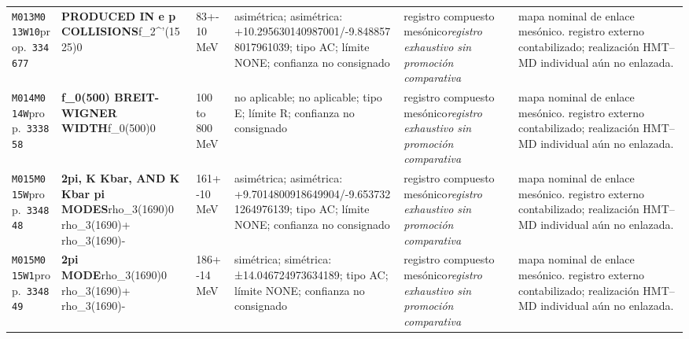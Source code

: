 \begin{landscape}
\begin{longtable}{L{1.85cm}L{4.45cm}L{2.35cm}L{4.05cm}L{3.35cm}L{7.15cm}}
\texttt{M013}\newline \texttt{M013W10}\newline prop.\ \texttt{334677} & \textbf{PRODUCED IN e p COLLISIONS}\newline f\_\allowbreak{}2\textasciicircum{}'(1525)0 & 83+-10\,MeV & asimétrica; asimétrica: +10.295630140987001/-9.8488578017961039; tipo AC; límite NONE; confianza no consignado & registro compuesto mesónico\newline \emph{registro exhaustivo sin promoción comparativa} & mapa nominal de enlace mesónico. registro externo contabilizado; realización HMT--MD individual aún no enlazada. \\
\texttt{M014}\newline \texttt{M014W}\newline prop.\ \texttt{333858} & \textbf{f\_\allowbreak{}0(500) BREIT-WIGNER WIDTH}\newline f\_\allowbreak{}0(500)0 & 100 to 800\,MeV & no aplicable; no aplicable; tipo E; límite R; confianza no consignado & registro compuesto mesónico\newline \emph{registro exhaustivo sin promoción comparativa} & mapa nominal de enlace mesónico. registro externo contabilizado; realización HMT--MD individual aún no enlazada. \\
\texttt{M015}\newline \texttt{M015W}\newline prop.\ \texttt{334848} & \textbf{2pi, K Kbar, AND K Kbar pi MODES}\newline rho\_\allowbreak{}3(1690)0 \textbar{}\allowbreak{} rho\_\allowbreak{}3(1690)+ \textbar{}\allowbreak{} rho\_\allowbreak{}3(1690)- & 161+-10\,MeV & asimétrica; asimétrica: +9.7014800918649904/-9.6537321264976139; tipo AC; límite NONE; confianza no consignado & registro compuesto mesónico\newline \emph{registro exhaustivo sin promoción comparativa} & mapa nominal de enlace mesónico. registro externo contabilizado; realización HMT--MD individual aún no enlazada. \\
\texttt{M015}\newline \texttt{M015W1}\newline prop.\ \texttt{334849} & \textbf{2pi MODE}\newline rho\_\allowbreak{}3(1690)0 \textbar{}\allowbreak{} rho\_\allowbreak{}3(1690)+ \textbar{}\allowbreak{} rho\_\allowbreak{}3(1690)- & 186+-14\,MeV & simétrica; simétrica: ±14.046724973634189; tipo AC; límite NONE; confianza no consignado & registro compuesto mesónico\newline \emph{registro exhaustivo sin promoción comparativa} & mapa nominal de enlace mesónico. registro externo contabilizado; realización HMT--MD individual aún no enlazada. \\

\end{longtable}
\end{landscape}
